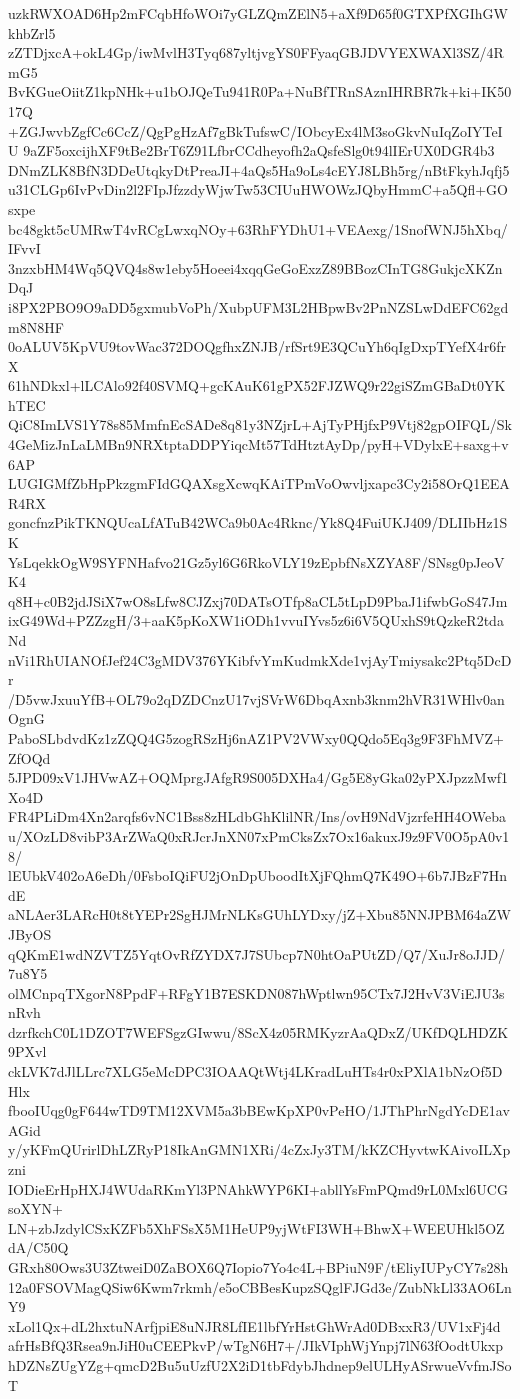uzkRWXOAD6Hp2mFCqbHfoWOi7yGLZQmZElN5+aXf9D65f0GTXPfXGIhGWkhbZrl5
zZTDjxcA+okL4Gp/iwMvlH3Tyq687yltjvgYS0FFyaqGBJDVYEXWAXl3SZ/4RmG5
BvKGueOiitZ1kpNHk+u1bOJQeTu941R0Pa+NuBfTRnSAznIHRBR7k+ki+IK5017Q
+ZGJwvbZgfCc6CcZ/QgPgHzAf7gBkTufswC/IObcyEx4lM3soGkvNuIqZoIYTeIU
9aZF5oxcijhXF9tBe2BrT6Z91LfbrCCdheyofh2aQsfeSlg0t94lIErUX0DGR4b3
DNmZLK8BfN3DDeUtqkyDtPreaJI+4aQs5Ha9oLs4cEYJ8LBh5rg/nBtFkyhJqfj5
u31CLGp6IvPvDin2l2FIpJfzzdyWjwTw53CIUuHWOWzJQbyHmmC+a5Qfl+GOsxpe
bc48gkt5cUMRwT4vRCgLwxqNOy+63RhFYDhU1+VEAexg/1SnofWNJ5hXbq/IFvvI
3nzxbHM4Wq5QVQ4s8w1eby5Hoeei4xqqGeGoExzZ89BBozCInTG8GukjcXKZnDqJ
i8PX2PBO9O9aDD5gxmubVoPh/XubpUFM3L2HBpwBv2PnNZSLwDdEFC62gdm8N8HF
0oALUV5KpVU9tovWac372DOQgfhxZNJB/rfSrt9E3QCuYh6qIgDxpTYefX4r6frX
61hNDkxl+lLCAlo92f40SVMQ+gcKAuK61gPX52FJZWQ9r22giSZmGBaDt0YKhTEC
QiC8ImLVS1Y78s85MmfnEcSADe8q81y3NZjrL+AjTyPHjfxP9Vtj82gpOIFQL/Sk
4GeMizJnLaLMBn9NRXtptaDDPYiqcMt57TdHtztAyDp/pyH+VDylxE+saxg+v6AP
LUGIGMfZbHpPkzgmFIdGQAXsgXcwqKAiTPmVoOwvljxapc3Cy2i58OrQ1EEAR4RX
goncfnzPikTKNQUcaLfATuB42WCa9b0Ac4Rknc/Yk8Q4FuiUKJ409/DLIIbHz1SK
YsLqekkOgW9SYFNHafvo21Gz5yl6G6RkoVLY19zEpbfNsXZYA8F/SNsg0pJeoVK4
q8H+c0B2jdJSiX7wO8sLfw8CJZxj70DATsOTfp8aCL5tLpD9PbaJ1ifwbGoS47Jm
ixG49Wd+PZZzgH/3+aaK5pKoXW1iODh1vvuIYvs5z6i6V5QUxhS9tQzkeR2tdaNd
nVi1RhUIANOfJef24C3gMDV376YKibfvYmKudmkXde1vjAyTmiysakc2Ptq5DcDr
/D5vwJxuuYfB+OL79o2qDZDCnzU17vjSVrW6DbqAxnb3knm2hVR31WHlv0anOgnG
PaboSLbdvdKz1zZQQ4G5zogRSzHj6nAZ1PV2VWxy0QQdo5Eq3g9F3FhMVZ+ZfOQd
5JPD09xV1JHVwAZ+OQMprgJAfgR9S005DXHa4/Gg5E8yGka02yPXJpzzMwf1Xo4D
FR4PLiDm4Xn2arqfs6vNC1Bss8zHLdbGhKlilNR/Ins/ovH9NdVjzrfeHH4OWeba
u/XOzLD8vibP3ArZWaQ0xRJcrJnXN07xPmCksZx7Ox16akuxJ9z9FV0O5pA0v18/
lEUbkV402oA6eDh/0FsboIQiFU2jOnDpUboodItXjFQhmQ7K49O+6b7JBzF7HndE
aNLAer3LARcH0t8tYEPr2SgHJMrNLKsGUhLYDxy/jZ+Xbu85NNJPBM64aZWJByOS
qQKmE1wdNZVTZ5YqtOvRfZYDX7J7SUbcp7N0htOaPUtZD/Q7/XuJr8oJJD/7u8Y5
olMCnpqTXgorN8PpdF+RFgY1B7ESKDN087hWptlwn95CTx7J2HvV3ViEJU3snRvh
dzrfkchC0L1DZOT7WEFSgzGIwwu/8ScX4z05RMKyzrAaQDxZ/UKfDQLHDZK9PXvl
ckLVK7dJlLLrc7XLG5eMcDPC3IOAAQtWtj4LKradLuHTs4r0xPXlA1bNzOf5DHlx
fbooIUqg0gF644wTD9TM12XVM5a3bBEwKpXP0vPeHO/1JThPhrNgdYcDE1avAGid
y/yKFmQUrirlDhLZRyP18IkAnGMN1XRi/4cZxJy3TM/kKZCHyvtwKAivoILXpzni
IODieErHpHXJ4WUdaRKmYl3PNAhkWYP6KI+abllYsFmPQmd9rL0Mxl6UCGsoXYN+
LN+zbJzdylCSxKZFb5XhFSsX5M1HeUP9yjWtFI3WH+BhwX+WEEUHkl5OZdA/C50Q
GRxh80Ows3U3ZtweiD0ZaBOX6Q7Iopio7Yo4c4L+BPiuN9F/tEliyIUPyCY7s28h
12a0FSOVMagQSiw6Kwm7rkmh/e5oCBBesKupzSQglFJGd3e/ZubNkLl33AO6LnY9
xLol1Qx+dL2hxtuNArfjpiE8uNJR8LfIE1lbfYrHstGhWrAd0DBxxR3/UV1xFj4d
afrHsBfQ3Rsea9nJiH0uCEEPkvP/wTgN6H7+/JIkVIphWjYnpj7lN63fOodtUkxp
hDZNsZUgYZg+qmcD2Bu5uUzfU2X2iD1tbFdybJhdnep9elULHyASrwueVvfmJSoT
